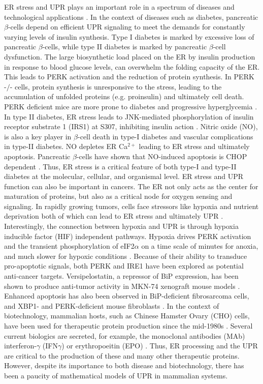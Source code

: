 \documentclass[fleqn,10pt]{wlscirep}
\begin{document}
ER stress and UPR plays an important role in a spectrum of diseases and technological applications \cite{Chakrabarti:2011aa}.
In the context of diseases such as diabetes, pancreatic $\beta$-cells depend on efficient UPR signaling to meet the demands for constantly varying levels of insulin synthesis.
Type I diabetes is marked by excessive loss of pancreatic $\beta$-cells, while type II diabetes is marked by pancreatic $\beta$-cell dysfunction.
The large biosynthetic load placed on the ER by insulin production in response to blood glucose levels, can overwhelm the folding capacity of the ER.
This leads to PERK activation and the reduction of protein synthesis.
In PERK $\textit{-/-}$ cells, protein synthesis is unresponsive to the stress, leading to the accumulation of unfolded proteins (e.g. proinsulin) and ultimately cell death.
PERK deficient mice are more prone to diabetes and progressive hyperglycemia \cite{harding2001dma}.
In type II diabetes, ER stress leads to JNK-mediated phosphorylation of insulin receptor substrate 1 (IRS1) at S307, inhibiting insulin action \cite{ozcan2004ers}.
Nitric oxide (NO), is also a key player in $\beta$-cell death in type-I diabetes and vascular complications in type-II diabetes.
NO depletes ER Ca$^{2+}$ leading to ER stress and ultimately apoptosis.
Pancreatic $\beta$-cells have shown that NO-induced apoptosis is CHOP dependent \cite{oyadomari2001noi}.
Thus, ER stress is a critical feature of both type-I and type-II diabetes at the molecular, cellular, and organismal level.
ER stress and UPR function can also be important in cancers.
The ER not only acts as the center for maturation of proteins, but also as a critical node for oxygen sensing and signaling.
In rapidly growing tumors, cells face stressors like hypoxia and nutrient deprivation both of which can lead to ER stress and ultimately UPR \cite{Koumenis:2006zr}.
Interestingly, the connection between hypoxia and UPR is through hypoxia inducible factor (HIF) independent pathways.
Hypoxia drives PERK activation and the transient phosphorylation of eIF2$\alpha$ \cite{koumenis2002regulation, ma2003delineation, koritzinsky2006gene}
on a time scale of minutes for anoxia, and much slower for hypoxic conditions \cite{koritzinsky2006gene}.
Because of their ability to transduce pro-apoptotic signals, both PERK and IRE1 have been explored as potential anti-cancer targets.
Versipelostatin, a repressor of BiP expression, has been shown to produce anti-tumor activity in MKN-74 xenograft mouse models \cite{park2004etc}.
Enhanced apoptosis has also been observed in BiP-deficient fibrosarcoma cells, and XBP1- and PERK-deficient mouse fibroblasts \cite{jamora1996itp, romero2004xbp1, bi2005esr}.
In the context of biotechnology, mammalian hosts, such as Chinese Hamster Ovary (CHO) cells, have been used for therapeutic protein production since the mid-1980s
\cite{Wurm:2004aa,Mohan:2008aa}. Several current biologics are secreted, for example, the monoclonal antibodies (MAb) interferon-$\gamma$ (IFN$\gamma$)
or erythropoeitin (EPO) \cite{Ku:2008aa}. Thus, ER processing and the UPR are critical to the production of these and many other therapeutic proteins.
However, despite its importance to both disease and biotechnology, there has been a paucity of mathematical models of UPR in mammalian systems.
\end{document}
